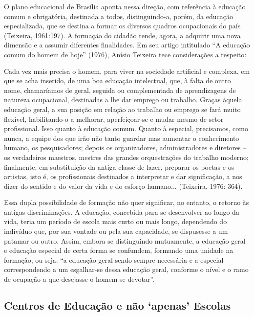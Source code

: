 O plano educacional de Brasília aponta nessa direção, com referência à
educação comum e obrigatória, destinada a todos, distinguindo-a, porém, da educação
especializada, que se destina a formar os diversos quadros ocupacionais do país
(Teixeira, 1961:197). A formação do cidadão tende, agora, a adquirir uma nova
dimensão e a assumir diferentes finalidades. Em seu artigo intitulado “A educação
comum do homem de hoje” (1976), Anísio Teixeira tece considerações a respeito:

\begin{citacao}
    Cada vez mais precisa o homem, para viver na sociedade artificial e
    complexa, em que se acha inserido, de uma boa educação intelectual, que, à
    falta de outro nome, chamaríamos de geral, seguida ou complementada de
    aprendizagens de natureza ocupacional, destinadas a lhe dar emprego ou
    trabalho. Graças àquela educação geral, a sua posição em relação ao
    trabalho ou emprego se fará muito flexível, habilitando-o a melhorar,
    aperfeiçoar-se e mudar mesmo de setor profissional. Isso quanto à educação
    comum. Quanto à especial, precisamos, como nunca, a equipe dos que irão
    não tanto guardar mas aumentar o conhecimento humano, os pesquisadores;
    depois os organizadores, administradores e diretores – os verdadeiros
    maestros, mestres das grandes orquestrações do trabalho moderno;
    finalmente, em substituição da antiga classe de lazer, preparar os poetas e os
    artistas, isto é, os profissionais destinados a interpretar e dar significação, a
    nos dizer do sentido e do valor da vida e do esforço humano... (Teixeira,
    1976: 364).
\end{citacao}

Essa dupla possibilidade de formação não quer significar, no entanto, o retorno
às antigas discriminações. A educação, concebida para se desenvolver ao longo da vida,
teria um período de escola mais curto ou mais longo, dependendo do indivíduo que, por
sua vontade ou pela sua capacidade, se dispusesse a um patamar ou outro. Assim,
embora se distinguindo mutuamente, a educação geral e educação especial de certa
forma se confundem, formando uma unidade na formação, ou seja: “a educação geral
sendo sempre necessária e a especial correspondendo a um esgalhar-se dessa educação
geral, conforme o nível e o ramo de ocupação a que desejasse o homem se devotar”. \\


\subsection{Centros de Educação e não ‘apenas’ Escolas }

